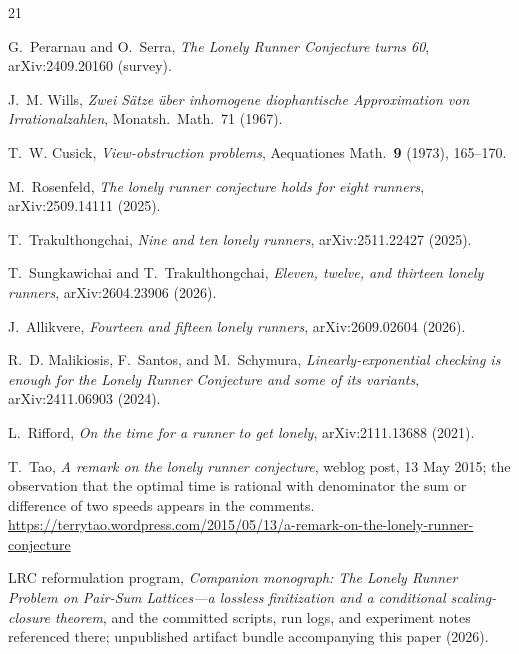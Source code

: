 
\begingroup\sloppy\raggedright
\begin{thebibliography}{21}

G.~Perarnau and O.~Serra,
\emph{The Lonely Runner Conjecture turns 60},
arXiv:2409.20160 (survey).

J.~M. Wills,
\emph{Zwei S\"atze \"uber inhomogene diophantische Approximation von
Irrationalzahlen},
Monatsh.\ Math.\ 71 (1967).

T.~W. Cusick,
\emph{View-obstruction problems},
Aequationes Math.\ \textbf{9} (1973), 165--170.

M.~Rosenfeld,
\emph{The lonely runner conjecture holds for eight runners},
arXiv:2509.14111 (2025).

T.~Trakulthongchai,
\emph{Nine and ten lonely runners},
arXiv:2511.22427 (2025).

T.~Sungkawichai and T.~Trakulthongchai,
\emph{Eleven, twelve, and thirteen lonely runners},
arXiv:2604.23906 (2026).

J.~Allikvere,
\emph{Fourteen and fifteen lonely runners},
arXiv:2609.02604 (2026).

R.~D. Malikiosis, F.~Santos, and M.~Schymura,
\emph{Linearly-exponential checking is enough for the Lonely Runner
Conjecture and some of its variants},
arXiv:2411.06903 (2024).

L.~Rifford,
\emph{On the time for a runner to get lonely},
arXiv:2111.13688 (2021).

T.~Tao,
\emph{A remark on the lonely runner conjecture},
weblog post, 13 May 2015; the observation that the optimal time is
rational with denominator the sum or difference of two speeds appears
in the comments.
\\[2pt]
\url{https://terrytao.wordpress.com/2015/05/13/a-remark-on-the-lonely-runner-conjecture}

LRC reformulation program,
\emph{Companion monograph: The Lonely Runner Problem on Pair-Sum
Lattices---a lossless finitization and a conditional scaling-closure
theorem}, and the committed scripts, run logs, and experiment notes
referenced there; unpublished artifact bundle accompanying this paper
(2026).


\end{thebibliography}
